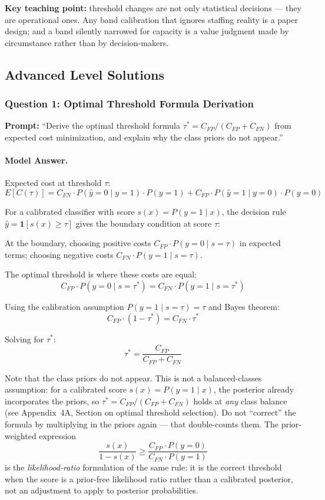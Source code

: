 \textbf{Key teaching point:} threshold changes are not only statistical decisions --- they are operational ones. Any band calibration that ignores staffing reality is a paper design; and a band silently narrowed for capacity is a value judgment made by circumstance rather than by decision-makers.

\subsection{Advanced Level Solutions}

\subsubsection{Question 1: Optimal Threshold Formula Derivation}

\textbf{Prompt:} ``Derive the optimal threshold formula $\tau^* = C_{FP} / (C_{FP} + C_{FN})$ from expected cost minimization, and explain why the class priors do not appear.''

\paragraph{Model Answer.}

Expected cost at threshold $\tau$:
\[
E[C(\tau)] = C_{FN} \cdot P(\hat{y}=0 \mid y=1) \cdot P(y=1) + C_{FP} \cdot P(\hat{y}=1 \mid y=0) \cdot P(y=0)
\]

For a calibrated classifier with score $s(x) = P(y=1 \mid x)$, the decision rule $\hat{y} = \mathbf{1}[s(x) \geq \tau]$ gives the boundary condition at score $\tau$:

At the boundary, choosing positive costs $C_{FP} \cdot P(y=0 \mid s=\tau)$ in expected terms; choosing negative costs $C_{FN} \cdot P(y=1 \mid s=\tau)$.

The optimal threshold is where these costs are equal:
\[
C_{FP} \cdot P(y=0 \mid s=\tau^*) = C_{FN} \cdot P(y=1 \mid s=\tau^*)
\]

Using the calibration assumption $P(y=1 \mid s=\tau) = \tau$ and Bayes theorem:
\[
C_{FP} \cdot (1 - \tau^*) = C_{FN} \cdot \tau^*
\]

Solving for $\tau^*$:
\[
\tau^* = \frac{C_{FP}}{C_{FP} + C_{FN}}
\]

Note that the class priors do not appear. This is not a balanced-classes assumption: for a calibrated score $s(x) = P(y=1 \mid x)$, the posterior already incorporates the priors, so $\tau^* = C_{FP}/(C_{FP} + C_{FN})$ holds at \emph{any} class balance (see Appendix~4A, Section on optimal threshold selection). Do not ``correct'' the formula by multiplying in the priors again --- that double-counts them. The prior-weighted expression
\[
\frac{s(x)}{1 - s(x)} \geq \frac{C_{FP} \cdot P(y=0)}{C_{FN} \cdot P(y=1)}
\]
is the \emph{likelihood-ratio} formulation of the same rule: it is the correct threshold when the score is a prior-free likelihood ratio rather than a calibrated posterior, not an adjustment to apply to posterior probabilities.


